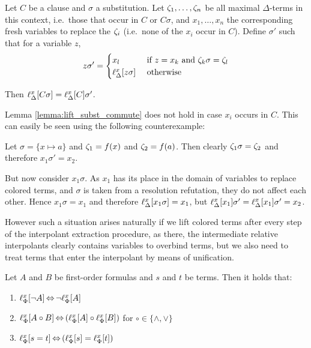 \documentclass[,%
	paper=a4,%
	DIV14, %
	twoside=false,%
	liststotoc,
	bibtotoc,
	draft=false,%
	numbers=noendperiod
]{scrartcl}
\begin{document}
\begin{lemma} 
	\label{lemma:lift_subst_commute}
	Let $C$ be a clause and $\sigma$ a substitution.
	Let $\colterm{1},\ldots,\colterm{n}$ be all maximal $\Delta$-terms in this context, i.e.\ those that occur in $C$ or $C\sigma$,  and
	$x_1, \ldots, x_n$ the corresponding fresh variables to replace the $\colterm{i}$ (i.e.~none of the $x_i$ occur in $C$).
	Define $\sigma'$ such that for a variable $z$,
	\[
		z \sigma' =
		\begin{cases} 
			x_l & \text{ if } z = x_k \text{ and } \colterm{k}\sigma = \colterm{l}  \\
			\lif{z\sigma} & \text{ otherwise}
		\end{cases} 
	\]

	Then
	$\lif{C\sigma} =
	\lif{C}\sigma'$.
\end{lemma}

\begin{remark}
	Lemma \ref{lemma:lift_subst_commute} does not hold in case $x_i$ occurs in $C$.
	This can easily be seen using the following counterexample:


	Let $\sigma = \{x \mapsto a\}$ and $\colterm{1} = f(x)$ and $\colterm{2} = f(a)$. 
	Then clearly $\colterm{1}\sigma = \colterm{2}$ and therefore $x_1\sigma' = x_2$.

	But now consider $x_1 \sigma$. 
	As $x_1$ has its place in the domain of variables to replace colored terms, and $\sigma$ is taken from a resolution refutation, they do not affect each other. 
	Hence $x_1\sigma = x_1$ and therefore $\lifdelta{x_1\sigma} = x_1$, but $\lifdelta{x_1}\sigma' = \lifdelta{x_1}\sigma' = x_2$.


	However such a situation arises naturally if we lift colored terms after every step of the interpolant extraction procedure, as there, the intermediate relative interpolants clearly contains variables to overbind terms, but we also need to treat terms that enter the interpolant by means of unification.
\end{remark}

\begin{lemma}
	\label{lemma:lift_logic_commute}
	Let $A$ and $B$ be first-order formulas and $s$ and $t$ be terms. Then it holds that:
	\begin{enumerate}
		\item $\lift{\Phi}{\lnot A}{x} \semiff{} \lnot \lift{\Phi}{A}{x}$
		\item $\lift{\Phi}{A \circ B}{x} \semiff{} ( \lift{\Phi}{A}{x} \circ \lift{\Phi}{B}{x} )$ for  $\circ \in     \{\land, \lor\}$
		\item $\lift{\Phi}{s = t}{x} \semiff{} ( \lift{\Phi}{s}{x} = \lift{\Phi}{t}{x} )$
	\end{enumerate}
\end{lemma}
\end{document}
